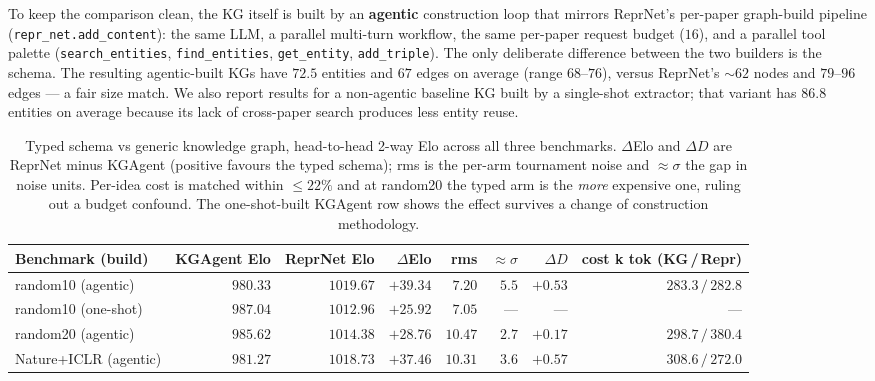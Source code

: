 \documentclass[10pt,twocolumn]{article}
\begin{document}
To keep the comparison clean, the KG itself is built by an
\textbf{agentic} construction loop that mirrors ReprNet's per-paper
graph-build pipeline (\texttt{repr\_net.add\_content}): the same
LLM, a parallel multi-turn workflow, the same per-paper request
budget ($16$), and a parallel tool palette (\texttt{search\_entities},
\texttt{find\_entities}, \texttt{get\_entity},
\texttt{add\_triple}).  The only deliberate difference between the
two builders is the schema.  The resulting agentic-built KGs have
$72.5$ entities and $67$ edges on average (range $68$--$76$),
versus ReprNet's $\sim62$ nodes and $79$--$96$ edges --- a fair
size match.  We also report results for a non-agentic baseline KG
built by a single-shot extractor; that variant has $86.8$ entities
on average because its lack of cross-paper search produces less
entity reuse.

\begin{table}[t]
\centering
\small
\setlength{\tabcolsep}{6pt}
\begin{tabular}{lrrrrrrr}
\toprule
Benchmark (build)        & KGAgent Elo & ReprNet Elo & $\Delta$Elo & rms   & $\approx\sigma$ & $\Delta D$ & cost k tok (KG\,/\,Repr) \\
\midrule
random10 (agentic)       & $980.33$    & $1019.67$   & $+39.34$    & $7.20$  & $5.5$ & $+0.53$ & $283.3\,/\,282.8$ \\
random10 (one-shot)      & $987.04$    & $1012.96$   & $+25.92$    & $7.05$  & ---   & ---     & ---               \\
random20 (agentic)       & $985.62$    & $1014.38$   & $+28.76$    & $10.47$ & $2.7$ & $+0.17$ & $298.7\,/\,380.4$ \\
Nature+ICLR (agentic)    & $981.27$    & $1018.73$   & $+37.46$    & $10.31$ & $3.6$ & $+0.57$ & $308.6\,/\,272.0$ \\
\bottomrule
\end{tabular}
\caption{Typed schema vs generic knowledge graph, head-to-head
2-way Elo across all three benchmarks.  $\Delta$Elo and $\Delta D$
are ReprNet minus KGAgent (positive favours the typed schema);
rms is the per-arm tournament noise and $\approx\sigma$ the gap in
noise units.  Per-idea cost is matched within $\leq 22\%$ and at
random20 the typed arm is the \emph{more} expensive one, ruling out
a budget confound.  The one-shot-built KGAgent row shows the effect
survives a change of construction methodology.}
\label{tab:schema-ablation}
\end{table}
\end{document}
